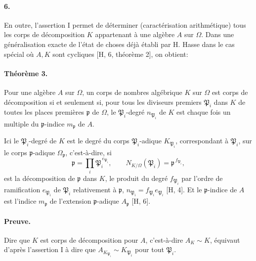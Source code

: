 \paragraph{6.}
En outre, l'assertion I permet de déterminer (caractérisation arithmétique) tous les corps de décomposition \(K\) appartenant à une algèbre \(A\) sur \(\Omega\). Dans une généralisation exacte de l'état de choses déjà établi par H. Hasse dans le cas spécial où \(A,K\) sont cycliques [H, 6, théorème 2], on obtient:

\paragraph{Théorème 3.}
Pour une algèbre \(A\) sur \(\Omega\), un corps de nombres algébrique \(K\) sur \(\Omega\) est corps de décomposition si et seulement si, pour tous les diviseurs premiers \(\mathfrak P_i\) dans \(K\) de toutes les places premières \(\mathfrak p\) de \(\Omega\), le \(\mathfrak P_i\)-degré \(n_{\mathfrak P_i}\) de \(K\) est chaque fois un multiple du \(\mathfrak p\)-indice \(m_{\mathfrak p}\) de \(A\).

Ici le \(\mathfrak P_i\)-degré de \(K\) est le degré du corps \(\mathfrak P_i\)-adique \(K_{\mathfrak P_i}\), correspondant à \(\mathfrak P_i\), sur le corps \(\mathfrak p\)-adique \(\Omega_{\mathfrak p}\), c'est-à-dire, si
\[
\mathfrak p=\prod_i \mathfrak P_i^{\,e_{\mathfrak P_i}},
        \qquad N_{K/\Omega}(\mathfrak P_i)=\mathfrak p^{\,f_{\mathfrak P_i}},
\]
est la décomposition de \(\mathfrak p\) dans \(K\), le produit du degré \(f_{\mathfrak P_i}\) par l'ordre de ramification \(e_{\mathfrak P_i}\) de \(\mathfrak P_i\) relativement à \(\mathfrak p\), \(n_{\mathfrak P_i}=f_{\mathfrak P_i}e_{\mathfrak P_i}\) [H, 4]. Et le \(\mathfrak p\)-indice de \(A\) est l'indice \(m_{\mathfrak p}\) de l'extension \(\mathfrak p\)-adique \(A_{\mathfrak p}\) [H, 6].

\paragraph{Preuve.}
Dire que \(K\) est corps de décomposition pour \(A\), c'est-à-dire \(A_K\sim K\), équivaut d'après l'assertion I à dire que \(A_{K_{\mathfrak P_i}}\sim K_{\mathfrak P_i}\) pour tout \(\mathfrak P_i\).

